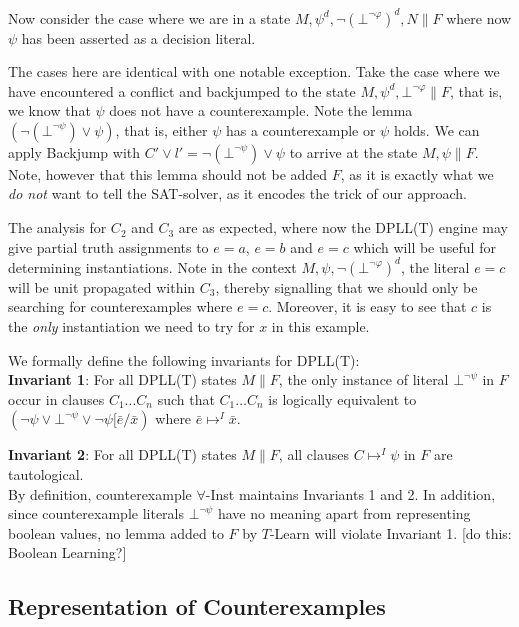 \documentclass{llncs}
\begin{document}
Now consider the case where we are in a state $M, \psi^d, \neg( \bot^{\neg \varphi} )^d, N  \parallel F$ where now $\psi$ has been asserted as a decision literal.

The cases here are identical with one notable exception.
Take the case where we have encountered a conflict and backjumped to the state $M, \psi^d, \bot^{\neg \varphi} \parallel F$, that is, we know that $\psi$ does not have a counterexample.
Note the lemma $(\neg (\bot^{\neg \psi}) \vee \psi)$, that is, either $\psi$ has a counterexample or $\psi$ holds.
We can apply Backjump with $C' \vee l' = \neg (\bot^{\neg \psi}) \vee \psi$ to arrive at the state $M, \psi \parallel F$.
Note, however that this lemma should not be added $F$, as it is exactly what we \emph{do not} want to tell the SAT-solver, as it encodes the trick of our approach.

The analysis for $C_2$ and $C_3$ are as expected, where now the DPLL(T) engine may give partial truth assignments to $e = a$, $e = b$ and $e = c$ which will be useful for determining instantiations.
Note in the context $M, \psi, \neg( \bot^{\neg \varphi} )^d$, the literal $e = c$ will be unit propagated within $C_3$, thereby signalling that we should only be searching for counterexamples where $e = c$.
Moreover, it is easy to see that $c$ is the \emph{only} instantiation we need to try for $x$ in this example.

We formally define the following invariants for DPLL(T): \\

{\bf Invariant 1}:
For all DPLL(T) states $M \parallel F$, the only instance of literal $\bot^{\neg \psi}$ in $F$ occur in clauses $C_1 \ldots C_n$ such that $C_1 \ldots C_n$ is logically equivalent to $( \neg \psi \vee \bot^{\neg \psi} \vee \neg \psi[\bar{e}/\bar{x} )$ where $\bar{e} \mapsto^I \bar{x}$.

{\bf Invariant 2}:
For all DPLL(T) states $M \parallel F$, all clauses $C \mapsto^I \psi$ in $F$ are tautological. \\

By definition, counterexample $\forall$-Inst maintains Invariants 1 and 2.
In addition, since counterexample literals $\bot^{ \neg \psi }$ have no meaning apart from representing boolean values, no lemma added to $F$ by $T$-Learn will violate Invariant 1.
[do this: Boolean Learning?]

\subsection{Representation of Counterexamples}
\end{document}
